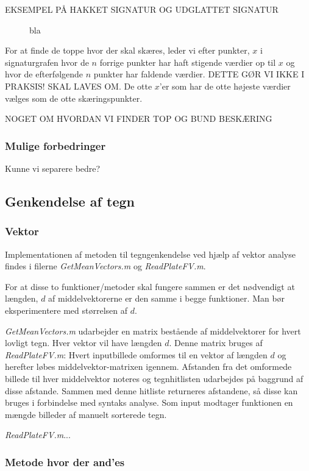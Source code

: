 EKSEMPEL PÅ HAKKET SIGNATUR OG UDGLATTET SIGNATUR

\begin{figure}[htp]
\label{fig:smoothSig}
\caption{bla}
\end{figure}

For at finde de toppe hvor der skal skæres, leder vi efter punkter, $x$ i signaturgrafen hvor de $n$ forrige punkter har haft stigende værdier op til $x$ og hvor de efterfølgende $n$ punkter har faldende værdier. DETTE GØR VI IKKE I PRAKSIS! SKAL LAVES OM. De otte $x$'er som har de otte højeste værdier vælges som de otte skæringspunkter.

NOGET OM HVORDAN VI FINDER TOP OG BUND BESKÆRING


\subsubsection{Mulige forbedringer}
Kunne vi separere bedre?

\subsection{Genkendelse af tegn}

\subsubsection{Vektor}

Implementationen af metoden til tegngenkendelse ved hjælp af vektor analyse findes i filerne \textit{GetMeanVectors.m} og \textit{ReadPlateFV.m}.

For at disse to funktioner/metoder skal fungere sammen er det nødvendigt at længden, $d$ af middelvektorerne er den samme i begge funktioner. Man bør eksperimentere med størrelsen af $d$.

\textit{GetMeanVectors.m} udarbejder en matrix bestående af middelvektorer for hvert lovligt tegn. Hver vektor vil have længden $d$. Denne matrix bruges af \textit{ReadPlateFV.m}: Hvert inputbillede omformes til en vektor af længden $d$ og herefter løbes middelvektor-matrixen igennem. Afstanden fra det omformede billede til hver middelvektor noteres og tegnhitlisten udarbejdes på baggrund af disse afstande. Sammen med denne hitliste returneres afstandene, så disse kan bruges i forbindelse med syntaks analyse.
Som input modtager funktionen en mængde billeder af manuelt sorterede tegn.

\textit{ReadPlateFV.m}...


\subsubsection{Metode hvor der and'es}

